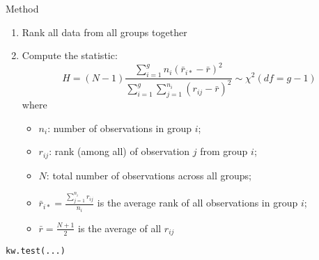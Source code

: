 \documentclass[table,10pt]{beamer}\usepackage[]{graphicx}\usepackage[]{color}
\begin{document}
\begin{CJK*}{UTF8}{gbsn}
\begin{frame}[t,containsverbatim]
\begin{alertblock}{\center Method}
\begin{enumerate}
	\item Rank all data from all groups together
	\item Compute the statistic:
	$$
H = (N-1)\frac{\sum_{i=1}^g n_i (\bar{r}_{i*} - \bar{r})^2}{\sum_{i=1}^g \sum_{j=1}^{n_i} (r_{ij} - \bar{r})^2} \sim \chi^2(df=g-1)
	$$
	where
	\begin{itemize}
		\item $n_i$: number of observations in group $i$;
		\item $r_{ij}$: rank (among all) of observation $j$ from group $i$;
		\item $N$: total number of observations across all groups;
		\item $\bar{r}_{i*} = \frac{\sum_{j=1}^{n_i} r_{ij}}{n_i}$ is the average rank of all observations in group $i$;
		\item $\bar{r} = \frac{N+1}{2}$ is the average of all $r_{ij}$ 
	\end{itemize}
\end{enumerate}
\end{alertblock}
\begin{lstlisting}
kw.test(...)
\end{lstlisting}
\end{frame}


\end{CJK*}
\end{document}
